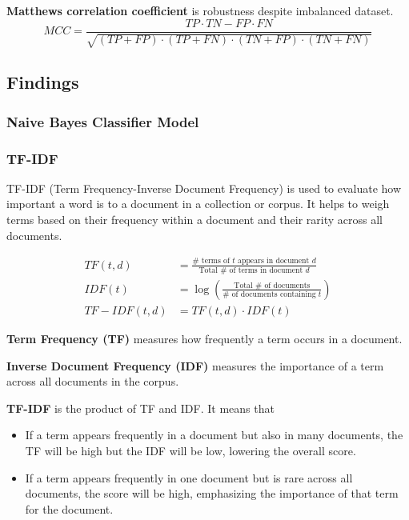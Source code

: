 \textbf{Matthews correlation coefficient} is robustness despite imbalanced dataset.
\begin{equation}
    MCC = \frac{TP \cdot TN - FP \cdot FN}{\sqrt{(TP + FP) \cdot (TP + FN) \cdot (TN + FP) \cdot (TN + FN)}}
\end{equation}





\subsection{Findings}

\subsubsection{Naive Bayes Classifier Model}



\subsubsection{TF-IDF \cite{learndatasci_tfidf}}
TF-IDF (Term Frequency-Inverse Document Frequency)  is used to evaluate how important a word is to a document in a collection or corpus.
It helps to weigh terms based on their frequency within a document and their rarity across all documents.

\begin{align}
    TF(t,d) &= \frac{\# \text{ terms of } t \text{ appears in document } d}{\text{Total } \# \text{ of terms in document }d}\\
    IDF(t) &= \log \left( \frac{\text{Total } \# \text{ of documents}}{\# \text{ of documents containing } t} \right)\\
    TF-IDF(t, d) &= TF(t,d) \cdot IDF(t)
\end{align}

\textbf{Term Frequency (TF)} measures how frequently a term occurs in a document.

\textbf{Inverse Document Frequency (IDF)} measures the importance of a term across all documents in the corpus.

\textbf{TF-IDF} is the product of TF and IDF. It means that 
\begin{itemize}
    \item If a term appears frequently in a document but also in many documents, the TF will be high but the IDF will be low, lowering the overall score.
    \item If a term appears frequently in one document but is rare across all documents, the score will be high, emphasizing the importance of that term for the document.
\end{itemize}



